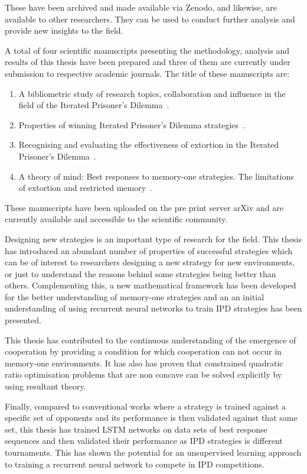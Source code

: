 These have been archived and made available via Zenodo, and likewise, are
available to other researchers. They can be used to conduct further analysis and
provide new insights to the field.

A total of four scientific manuscripts presenting the methodology, analysis and
results of this thesis have been prepared and three of them are currently under
submission to respective academic journals. The title of these manuscripts are:

\begin{enumerate}
    \item A bibliometric study of research topics, collaboration and influence
    in the field of the Iterated Prisoner's Dilemma~\cite{Glynatsi2019_bibliometric}.
    \item Properties of winning Iterated Prisoner's Dilemma
    strategies~\cite{Glynatsi2020meta_article}.
    \item Recognising and evaluating the effectiveness of extortion in the
    Iterated Prisoner's Dilemma~\cite{Knight2019}.
    \item A theory of mind: Best responses to memory-one strategies.
    The limitations of extortion and restricted memory~\cite{Glynatsi2019theory}.
\end{enumerate}

These manuscripts have been uploaded on the pre
print server arXiv and are currently available and accessible to the scientific
community.

Designing new strategies is an important type of research for the field.
This thesis has introduced an abundant number of properties of successful
strategies which can be of interest to researchers designing a new strategy
for new environments, or just to understand the reasons behind some strategies
being better than others. Complementing this, a new mathematical framework has
been developed for the better understanding of memory-one strategies and an
an initial understanding of using recurrent neural networks to train IPD
strategies has been presented.

This thesis has contributed to the continuous understanding of the emergence of
cooperation by providing a condition for which cooperation can not occur in
memory-one environments. It has also has proven that constrained quadratic
ratio optimisation problems that are non concave can be solved explicitly by
using resultant theory.

Finally, compared to conventional works where a strategy is trained against a
specific set of opponents and its performance is then validated against that
same set, this thesis has trained LSTM networks on data sets of best response
sequences and then validated their performance as IPD strategies is
\metatournamentslstm different tournaments. This has shown the potential for an
unsupervised learning approach to training a recurrent neural network to compete
in IPD competitions.

